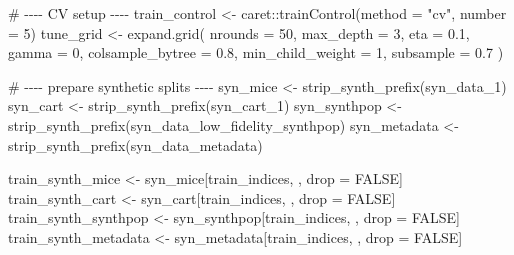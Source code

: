 \documentclass[
  letterpaper,
  DIV=11,
  numbers=noendperiod]{scrartcl}
\newenvironment{Shaded}{\begin{snugshade}}{\end{snugshade}}
\newcommand{\AttributeTok}[1]{\textcolor[rgb]{0.40,0.45,0.13}{#1}}
\newcommand{\CommentTok}[1]{\textcolor[rgb]{0.37,0.37,0.37}{#1}}
\newcommand{\ConstantTok}[1]{\textcolor[rgb]{0.56,0.35,0.01}{#1}}
\newcommand{\DecValTok}[1]{\textcolor[rgb]{0.68,0.00,0.00}{#1}}
\newcommand{\FloatTok}[1]{\textcolor[rgb]{0.68,0.00,0.00}{#1}}
\newcommand{\FunctionTok}[1]{\textcolor[rgb]{0.28,0.35,0.67}{#1}}
\newcommand{\NormalTok}[1]{\textcolor[rgb]{0.00,0.23,0.31}{#1}}
\newcommand{\OtherTok}[1]{\textcolor[rgb]{0.00,0.23,0.31}{#1}}
\newcommand{\SpecialCharTok}[1]{\textcolor[rgb]{0.37,0.37,0.37}{#1}}
\newcommand{\StringTok}[1]{\textcolor[rgb]{0.13,0.47,0.30}{#1}}
\begin{document}
\begin{Shaded}
\begin{Highlighting}[]
\CommentTok{\# {-}{-}{-}{-} CV setup {-}{-}{-}{-}}
\NormalTok{train\_control }\OtherTok{\textless{}{-}}\NormalTok{ caret}\SpecialCharTok{::}\FunctionTok{trainControl}\NormalTok{(}\AttributeTok{method =} \StringTok{"cv"}\NormalTok{, }\AttributeTok{number =} \DecValTok{5}\NormalTok{)}
\NormalTok{tune\_grid }\OtherTok{\textless{}{-}} \FunctionTok{expand.grid}\NormalTok{(}
  \AttributeTok{nrounds =} \DecValTok{50}\NormalTok{,}
  \AttributeTok{max\_depth =} \DecValTok{3}\NormalTok{,}
  \AttributeTok{eta =} \FloatTok{0.1}\NormalTok{,}
  \AttributeTok{gamma =} \DecValTok{0}\NormalTok{,}
  \AttributeTok{colsample\_bytree =} \FloatTok{0.8}\NormalTok{,}
  \AttributeTok{min\_child\_weight =} \DecValTok{1}\NormalTok{,}
  \AttributeTok{subsample =} \FloatTok{0.7}
\NormalTok{)}

\CommentTok{\# {-}{-}{-}{-} prepare synthetic splits {-}{-}{-}{-}}
\NormalTok{syn\_mice      }\OtherTok{\textless{}{-}} \FunctionTok{strip\_synth\_prefix}\NormalTok{(syn\_data\_1)}
\NormalTok{syn\_cart      }\OtherTok{\textless{}{-}} \FunctionTok{strip\_synth\_prefix}\NormalTok{(syn\_cart\_1)}
\NormalTok{syn\_synthpop  }\OtherTok{\textless{}{-}} \FunctionTok{strip\_synth\_prefix}\NormalTok{(syn\_data\_low\_fidelity\_synthpop)}
\NormalTok{syn\_metadata  }\OtherTok{\textless{}{-}} \FunctionTok{strip\_synth\_prefix}\NormalTok{(syn\_data\_metadata)}

\NormalTok{train\_synth\_mice     }\OtherTok{\textless{}{-}}\NormalTok{ syn\_mice[train\_indices, , drop }\OtherTok{=} \ConstantTok{FALSE}\NormalTok{]}
\NormalTok{train\_synth\_cart     }\OtherTok{\textless{}{-}}\NormalTok{ syn\_cart[train\_indices, , drop }\OtherTok{=} \ConstantTok{FALSE}\NormalTok{]}
\NormalTok{train\_synth\_synthpop }\OtherTok{\textless{}{-}}\NormalTok{ syn\_synthpop[train\_indices, , drop }\OtherTok{=} \ConstantTok{FALSE}\NormalTok{]}
\NormalTok{train\_synth\_metadata }\OtherTok{\textless{}{-}}\NormalTok{ syn\_metadata[train\_indices, , drop }\OtherTok{=} \ConstantTok{FALSE}\NormalTok{]}


\end{Highlighting}
\end{Shaded}
\end{document}
